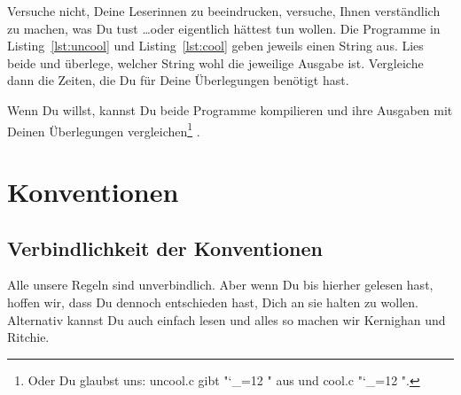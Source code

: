 \documentclass[twoside]{scrreprt}
\begin{document}
Versuche nicht, Deine Leserinnen zu beeindrucken, versuche, Ihnen
verst\"a{}ndlich zu machen, was Du tust \ldots oder eigentlich h\"a{}ttest tun
wollen.
Die Programme in  Listing~\ref{lst:uncool} und Listing~\ref{lst:cool} geben
jeweils einen String aus. Lies beide und
\"u{}berlege, welcher String wohl die jeweilige Ausgabe ist. Vergleiche dann die
Zeiten, die Du f\"u{}r Deine \"U{}berlegungen ben\"o{}tigt
hast.




Wenn Du willst, kannst Du  beide Programme kompilieren und ihre Ausgaben mit
Deinen \"U{}berlegungen vergleichen\footnote{%
%
Oder Du glaubst uns: uncool.c gibt
"\catcode`_=12 \ttfamily "
aus und cool.c
"\catcode`_=12 \ttfamily ".
}%
.

\chapter{Konventionen\label{sec:conventions}}
\section{Verbindlichkeit der Konventionen\label{sec:zwang}}
Alle unsere Regeln sind unverbindlich. Aber wenn Du bis hierher gelesen hast,
hoffen wir, dass Du dennoch entschieden hast, Dich an sie halten zu wollen.
Alternativ kannst Du auch einfach \cite{KR} lesen und alles so machen wir
Kernighan und Ritchie.
\end{document}
